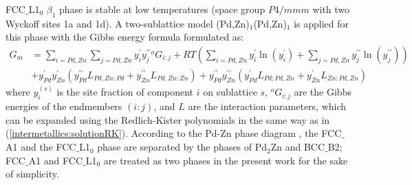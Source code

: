FCC$\_$L1$_0$ $\beta_1$ phase is stable at low temperatures (space group $P4/mmm$ with two Wyckoff sites 1a and 1d). A two-sublattice model (Pd,Zn)$_1$(Pd,Zn)$_1$ is applied for this phase with the Gibbs energy formula formulated as:
\begin{equation} \label{intermetallics:L10G}
    \begin{aligned}
    G_m & =\sum_{i=Pd,Zn}{\sum_{j=Pd,Zn}{y_i^\prime y_j^{\prime\prime}}{^o}G_{i:j}}+RT(\sum_{i=Pd,Zn}{y_i^\prime\ln{\left(y_i^\prime\right)}}+\sum_{j=Pd,Zn}{y_j^{\prime\prime}\ln{\left(y_j^{\prime\prime}\right)}})\\&+y_{Pd}^{\prime}y_{Zn}^{\prime}\left(y_{Pd}^{\prime\prime}L_{Pd,Zn:Pd}+y_{Zn}^{\prime\prime}L_{Pd,Zn:Zn}\right)+y_{Pd}^{\prime\prime}y_{Zn}^{\prime\prime}\left(y_{Pd}^\prime L_{Pd:Pd,Zn}+y_{Zn}^\prime L_{Zn:Pd,Zn}\right)
    \end{aligned}
\end{equation}
where $y_i^{(s)}$ is the site fraction of component $i$ on sublattice $s$, ${^o}G_{i:j}$ are the Gibbs energies of the endmembers $(i:j)$, and $L$ are the interaction parameters, which can be expanded using the Redlich-Kister polynomials \cite{redlich1948algebraic} in the same way as in (\ref{intermetallics:solutionRK}). According to the Pd-Zn phase diagram \cite{vizdal2006experimental}, the FCC$\_$A1 and the FCC$\_$L1$_0$ phase are separated by the phases of Pd$_2$Zn and BCC$\_$B2; FCC$\_$A1 and FCC$\_$L1$_0$ are treated as two phases in the present work for the sake of simplicity.

